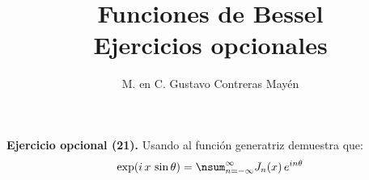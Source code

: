 
\title{Funciones de Bessel \\[0.3em]  \large{Ejercicios opcionales} \vspace{-3ex}}
\author{M. en C. Gustavo Contreras Mayén}
\date{ }


\vspace{-4cm}
\maketitle
\fontsize{14}{14}\selectfont

\noindent
\textbf{Ejercicio opcional (21).} Usando al función generatriz demuestra que:
\begin{align*}
\exp(i \, x \, \sin \theta) = \nsum_{n=-\infty}^{\infty} J_{n}(x) \, e^{i n \theta}
\end{align*}
